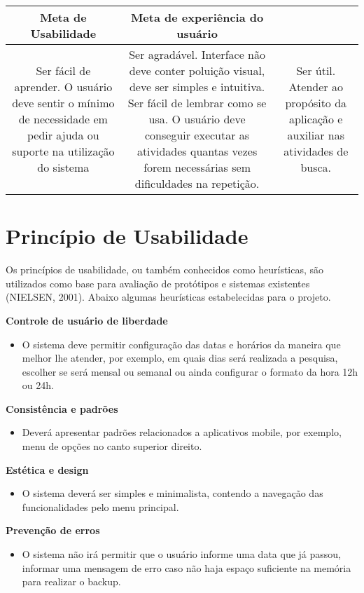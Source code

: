 \begin{table}[H]
	\centering
	\begin{tabular}{ccc}
		\toprule
			Meta de Usabilidade & Meta de experiência do usuário\\ \hline
		\midrule
			Ser fácil de aprender. O usuário deve sentir o mínimo de necessidade em pedir ajuda ou suporte na utilização do sistema & Ser agradável. Interface não deve conter poluição visual, deve ser simples e intuitiva.
			Ser fácil de lembrar como se usa. O usuário deve conseguir executar as atividades quantas vezes forem necessárias sem dificuldades na repetição. & Ser útil. Atender ao propósito da aplicação e auxiliar nas atividades de busca.
	\end{tabular}
	\caption{}
	\label{tab01}
\end{table}

\section{Princípio de Usabilidade}
Os princípios de usabilidade, ou também conhecidos como heurísticas, são utilizados como base para avaliação de protótipos e sistemas existentes (NIELSEN, 2001).
Abaixo algumas heurísticas estabelecidas para o projeto.

\textbf{Controle de usuário de liberdade}
\begin{itemize}
	\item O sistema deve permitir configuração das datas e horários da maneira que melhor lhe atender, por exemplo, em quais dias será realizada a pesquisa, escolher se será mensal ou semanal ou ainda configurar o formato da hora 12h ou 24h.
\end{itemize}

\textbf{Consistência e padrões}
\begin{itemize}
	\item Deverá apresentar padrões relacionados a aplicativos mobile, por exemplo, menu de opções no canto superior direito.
\end{itemize}

\textbf{Estética e design}
\begin{itemize}
	\item O sistema deverá ser simples e minimalista, contendo a navegação das funcionalidades pelo menu principal.
\end{itemize}

\textbf{Prevenção de erros}
\begin{itemize}
	\item O sistema não irá permitir que o usuário informe uma data que já passou, informar uma mensagem de erro caso não haja espaço suficiente na memória para realizar o backup.
\end{itemize}